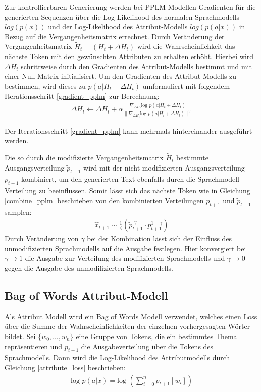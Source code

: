 Zur kontrollierbaren Generierung werden bei PPLM-Modellen Gradienten für die generierten Sequenzen über die Log-Likelihood des normalen Sprachmodells $log(p(x))$ und der Log-Likelihood des Attribut-Modells $log(p(a|x))$ in Bezug auf die Vergangenheitsmatrix errechnet. 
Durch Veränderung der Vergangenheitsmatrix $\tilde{H}_t = (H_t+\Delta H_t)$ wird die Wahrscheinlichkeit das nächste Token mit den gewünschten Attributen zu erhalten erhöht. 
Hierbei wird $\Delta H_t$ schrittweise durch den Gradienten des Attribut-Modells bestimmt und mit einer Null-Matrix initialisiert.
Um den Gradienten des Attribut-Modells zu bestimmen, wird dieses zu $p(a|H_t+\Delta H_t)$ umformuliert mit folgendem Iterationsschritt \ref{gradient_pplm} zur Berechnung:
\begin{align}
    \label{gradient_pplm}
\Delta H_t \leftarrow \Delta H_t + \alpha \frac{\nabla_{\Delta H_t} \text{log }p(a|H_t+\Delta H_t)}{\| \nabla_{\Delta H_t} \text{log }p(a|H_t+\Delta H_t)\|^\gamma}
\end{align}

Der Iterationsschritt \ref{gradient_pplm} kann mehrmals hintereinander ausgeführt werden.

Die so durch die modifizierte Vergangenheitsmatrix $\tilde{H}_t$ bestimmte Ausgangsverteilung $\tilde{p}_{t+1}$ wird mit der nicht modifizierten Ausgangsverteilung $p_{t+1}$ kombiniert, um den generierten Text ebenfalls durch die Sprachmodell-Verteilung zu beeinflussen.
Somit lässt sich das nächste Token wie in Gleichung \ref{combine_pplm} beschrieben von den kombinierten Verteilungen $p_{t+1}$ und $\tilde{p}_{t+1}$ samplen: \begin{align} \label{combine_pplm}\hat{x}_{t+1} \sim \frac{1}{\beta} (\tilde{p}_{t+1}^{\text{ }\gamma} \cdot p_{t+1}^{1-\gamma})\end{align}
Durch Veränderung von $\gamma$ bei der Kombination lässt sich der Einfluss des unmodifizierten Sprachmodells auf die Ausgabe festlegen. Hier konvergiert bei $\gamma \rightarrow 1$ die Ausgabe zur Verteilung des modifizierten Sprachmodells und $\gamma \rightarrow 0$ gegen die Ausgabe des unmodifizierten Sprachmodells.




\subsection{Bag of Words Attribut-Modell}
Als Attribut Modell wird ein Bag of Words Modell verwendet, welches einen Loss über die Summe der Wahrscheinlichkeiten der einzelnen vorhergesagten Wörter bildet.
Sei $\{w_0, \ldots, w_n\}$ eine Gruppe von Tokens, die ein bestimmtes Thema repräsentieren und $p_{t+1}$ die Ausgabeverteilung über die Tokens des Sprachmodells.
Dann wird die Log-Likelihood des Attributmodells durch Gleichung \ref{attribute_loss} beschrieben: 
\begin{align}
    \label{attribute_loss}
    \text{log }p(a|x) = \text{log }(\sum_{i=0}^n p_{t+1}[w_i])
\end{align}

